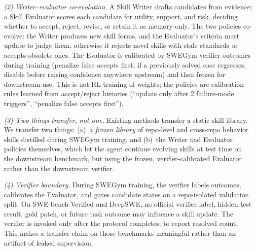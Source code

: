 \emph{(2) Writer--evaluator co-evolution.} A Skill Writer drafts candidates
from evidence; a Skill Evaluator scores each candidate for utility, support,
and risk, deciding whether to accept, reject, revise, or retain it as
memory-only. The two policies co-evolve: the Writer produces new skill forms,
and the Evaluator's criteria must update to judge them, otherwise it rejects
novel skills with stale standards or accepts obsolete ones. The Evaluator is
calibrated by SWEGym verifier outcomes during training (penalize false accepts
first; if a previously solved case regresses, disable before raising
confidence anywhere upstream) and then frozen for downstream use. This is not
RL training of weights; the policies are calibration rules learned from
accept/reject histories (``update only after 2 failure-mode triggers'',
``penalize false accepts first'').

\emph{(3) Two things transfer, not one.} Existing methods transfer a static
skill library. We transfer two things: (a)~a \emph{frozen library} of
repo-level and cross-repo behavior skills distilled during SWEGym training, and
(b)~the Writer and Evaluator policies themselves, which let the agent continue
evolving skills at test time on the downstream benchmark, but using the
frozen, verifier-calibrated Evaluator rather than the downstream verifier.

\emph{(4) Verifier boundary.} During SWEGym training, the verifier labels
outcomes, calibrates the Evaluator, and gates candidate states on a
repo-isolated validation split. On SWE-bench Verified and DeepSWE, no official
verifier label, hidden test result, gold patch, or future task outcome may
influence a skill update. The verifier is invoked only after the protocol
completes, to report resolved count. This makes a transfer claim on those
benchmarks meaningful rather than an artifact of leaked supervision.

